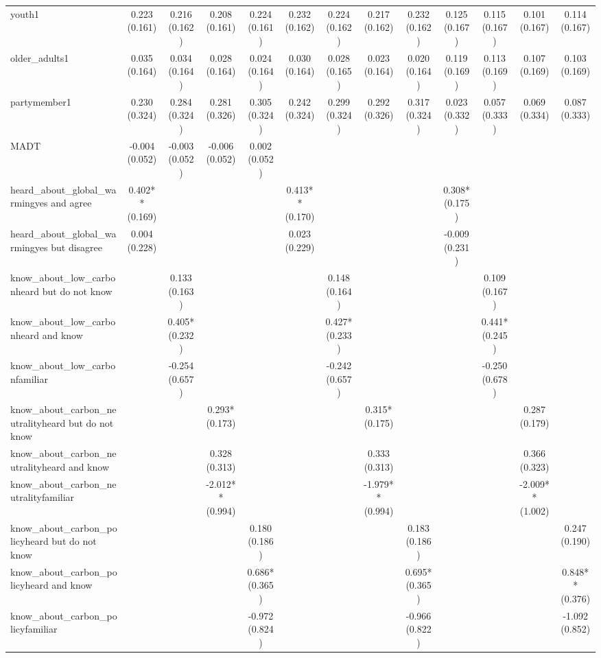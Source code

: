 \begin{table}[!htbp]
\begin{tabular}{lcccccccccccc}
youth1 & 0.223 (0.161) & 0.216 (0.162) & 0.208 (0.161) & 0.224 (0.161) & 0.232 (0.162) & 0.224 (0.162) & 0.217 (0.162) & 0.232 (0.162) & 0.125 (0.167) & 0.115 (0.167) & 0.101 (0.167) & 0.114 (0.167) \\
older\_adults1 & 0.035 (0.164) & 0.034 (0.164) & 0.028 (0.164) & 0.024 (0.164) & 0.030 (0.164) & 0.028 (0.165) & 0.023 (0.164) & 0.020 (0.164) & 0.119 (0.169) & 0.113 (0.169) & 0.107 (0.169) & 0.103 (0.169) \\
partymember1 & 0.230 (0.324) & 0.284 (0.324) & 0.281 (0.326) & 0.305 (0.324) & 0.242 (0.324) & 0.299 (0.324) & 0.292 (0.326) & 0.317 (0.324) & 0.023 (0.332) & 0.057 (0.333) & 0.069 (0.334) & 0.087 (0.333) \\
MADT & -0.004 (0.052) & -0.003 (0.052) & -0.006 (0.052) & 0.002 (0.052) &  &  &  &  &  &  &  &  \\
heard\_about\_global\_warmingyes and agree & 0.402** (0.169) &  &  &  & 0.413** (0.170) &  &  &  & 0.308* (0.175) &  &  &  \\
heard\_about\_global\_warmingyes but disagree & 0.004 (0.228) &  &  &  & 0.023 (0.229) &  &  &  & -0.009 (0.231) &  &  &  \\
know\_about\_low\_carbonheard but do not know &  & 0.133 (0.163) &  &  &  & 0.148 (0.164) &  &  &  & 0.109 (0.167) &  &  \\
know\_about\_low\_carbonheard and know &  & 0.405* (0.232) &  &  &  & 0.427* (0.233) &  &  &  & 0.441* (0.245) &  &  \\
know\_about\_low\_carbonfamiliar &  & -0.254 (0.657) &  &  &  & -0.242 (0.657) &  &  &  & -0.250 (0.678) &  &  \\
know\_about\_carbon\_neutralityheard but do not know &  &  & 0.293* (0.173) &  &  &  & 0.315* (0.175) &  &  &  & 0.287 (0.179) &  \\
know\_about\_carbon\_neutralityheard and know &  &  & 0.328 (0.313) &  &  &  & 0.333 (0.313) &  &  &  & 0.366 (0.323) &  \\
know\_about\_carbon\_neutralityfamiliar &  &  & -2.012** (0.994) &  &  &  & -1.979** (0.994) &  &  &  & -2.009** (1.002) &  \\
know\_about\_carbon\_policyheard but do not know &  &  &  & 0.180 (0.186) &  &  &  & 0.183 (0.186) &  &  &  & 0.247 (0.190) \\
know\_about\_carbon\_policyheard and know &  &  &  & 0.686* (0.365) &  &  &  & 0.695* (0.365) &  &  &  & 0.848** (0.376) \\
know\_about\_carbon\_policyfamiliar &  &  &  & -0.972 (0.824) &  &  &  & -0.966 (0.822) &  &  &  & -1.092 (0.852) \\

\end{tabular}
\end{table}
